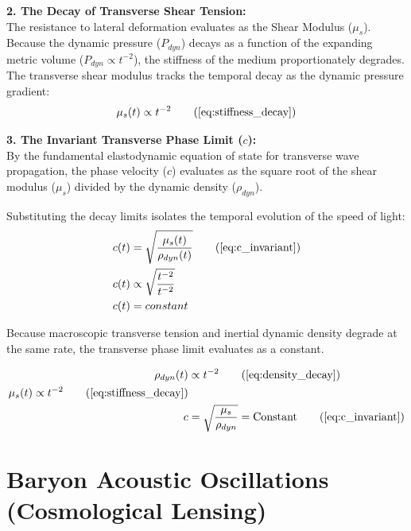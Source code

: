\textbf{2. The Decay of Transverse Shear Tension:} \\
The resistance to lateral deformation evaluates as the Shear Modulus ($\mu_s$). Because the dynamic pressure ($P_{dyn}$) decays as a function of the expanding metric volume ($P_{dyn} \propto t^{-2}$), the stiffness of the medium proportionately degrades. The transverse shear modulus tracks the temporal decay as the dynamic pressure gradient:
\begin{equation}
    \mu_s(t) \propto t^{-2} \tag{\ref{eq:stiffness_decay}} %
\end{equation}

\textbf{3. The Invariant Transverse Phase Limit ($c$):} \\
By the fundamental elastodynamic equation of state for transverse wave propagation, the phase velocity ($c$) evaluates as the square root of the shear modulus ($\mu_s$) divided by the dynamic density ($\rho_{dyn}$). 

Substituting the decay limits isolates the temporal evolution of the speed of light:
\begin{align}
    c(t) &= \sqrt{\frac{\mu_s(t)}{\rho_{dyn}(t)}} \tag{\ref{eq:c_invariant}} \\ %
    c(t) &\propto \sqrt{\frac{t^{-2}}{t^{-2}}}  \\
    c(t) &= constant 
\end{align}

Because macroscopic transverse tension and inertial dynamic density degrade at the same rate, the transverse phase limit evaluates as a constant. 

\begin{tcolorbox}[recallbox, title={\ref{box:acoustic_invariance}. Cosmic Expansion \& Acoustic Invariance}] 
\begin{align}
    \rho_{dyn}(t) &\propto t^{-2} \tag{\ref{eq:density_decay}} \\
    \mu_s(t) \propto t^{-2} \tag{\ref{eq:stiffness_decay}} \\
    c &= \sqrt{\frac{\mu_s}{\rho_{dyn}}} = \text{Constant} \tag{\ref{eq:c_invariant}}
\end{align}
\end{tcolorbox}

\section{Baryon Acoustic Oscillations (Cosmological Lensing)}
\label{sec:deriv_bao_lensing}

